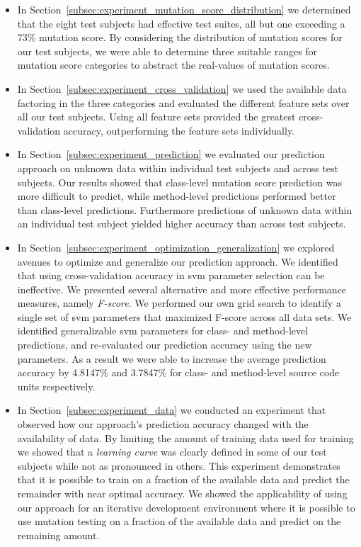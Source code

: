 \begin{itemize}
  \item In Section~\ref{subsec:experiment_mutation_score_distribution} we determined that the eight test subjects had effective test suites, all but one exceeding a 73\% mutation score. By considering the distribution of mutation scores for our test subjects, we were able to determine three suitable ranges for mutation score categories to abstract the real-values of mutation scores.
  \item In Section~\ref{subsec:experiment_cross_validation} we used the available data factoring in the three categories and evaluated the different feature sets over all our test subjects. Using all feature sets provided the greatest cross-validation accuracy, outperforming the feature sets individually.
  \item In Section~\ref{subsec:experiment_prediction} we evaluated our prediction approach on unknown data within individual test subjects and across test subjects. Our results showed that class-level mutation score prediction was more difficult to predict, while method-level predictions performed better than class-level predictions. Furthermore predictions of unknown data within an individual test subject yielded higher accuracy than across test subjects.
  \item In Section~\ref{subsec:experiment_optimization_generalization} we explored avenues to optimize and generalize our prediction approach. We identified that using cross-validation accuracy in \gls{svm} parameter selection can be ineffective. We presented several alternative and more effective performance measures, namely \emph{F-score}. We performed our own grid search to identify a single set of \gls{svm} parameters that maximized F-score across all data sets. We identified generalizable \gls{svm} parameters for class- and method-level predictions, and re-evaluated our prediction accuracy using the new parameters. As a result we were able to increase the average prediction accuracy by 4.8147\% and 3.7847\% for class- and method-level source code units respectively.
  \item In Section~\ref{subsec:experiment_data} we conducted an experiment that observed how our approach's prediction accuracy changed with the availability of data. By limiting the amount of training data used for training we showed that a \emph{learning curve} was clearly defined in some of our test subjects while not as pronounced in others. This experiment demonstrates that it is possible to train on a fraction of the available data and predict the remainder with near optimal accuracy. We showed the applicability of using our approach for an iterative development environment where it is possible to use mutation testing on a fraction of the available data and predict on the remaining amount.
\end{itemize}



